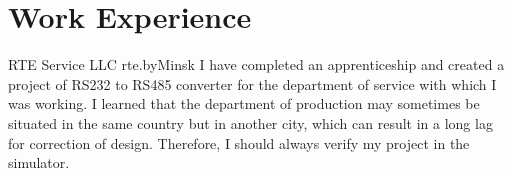 \section{Work Experience}
{RTE Service LLC rte.by}{Minsk}{}{
  I have completed an apprenticeship and created a project of RS232 to
  RS485 converter for the department of service with which I was
  working. I learned that the department of production may sometimes be
  situated in the same country but in another city, which can result in
  a long lag for correction of design. Therefore, I should always verify
  my project in the simulator.}



